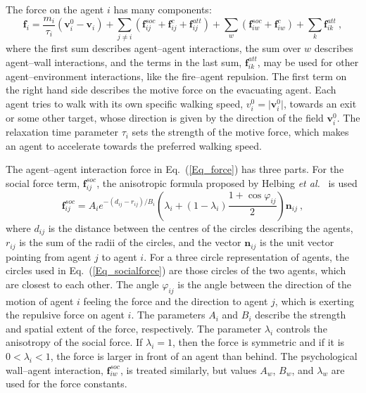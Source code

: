 \documentclass[12pt,a4paper,final,twoside]{stylevk}
\begin{document}
The force on the agent $i$ has many components:
%
\begin{equation}\label{Eq_force}
  \mathbf{f}_i = \frac{m_i}{\tau_i} \left( \mathbf{v}_i^0 -
    \mathbf{v}_i\right) + \sum_{j \ne i} \left( \mathbf{f}_{ij}^{soc}
    + \mathbf{f}_{ij}^{c} + \mathbf{f}_{ij}^{att} \right) + \sum_{w}
  \left( \mathbf{f}^{soc}_{iw} + \mathbf{f}^{c}_{iw} \right) + \sum_{k}
  \mathbf{f}_{ik}^{att} ~,
\end{equation}
%
where the first sum describes agent--agent interactions, the sum over
$w$ describes agent--wall interactions, and the terms in the last sum,
$\mathbf{f}_{ik}^{att}$, may be used for other agent--environment
interactions, like the fire--agent repulsion.  The first term on the
right hand side describes the motive force on the evacuating agent.
Each agent tries to walk with its own specific walking speed, $v^0_i =
\vert \mathbf{v}_i^0 \vert$, towards an exit or some other target,
whose direction is given by the direction of the field $
\mathbf{v}_i^0 $.  The relaxation time parameter $\tau_i$ sets the
strength of the motive force, which makes an agent to accelerate
towards the preferred walking speed.

The agent--agent interaction force in Eq.~(\ref{Eq_force}) has three
parts.  For the social force term, $\mathbf{f}_{ij}^{soc}$, the
anisotropic formula proposed by Helbing {\em et al.}~\cite{Helbing02}
is used
%
\begin{equation}\label{Eq_socialforce}
 \mathbf{f}_{ij}^{soc} = A_i e^{-(d_{ij}-r_{ij})/B_i }
 \left ( \lambda_i + (1-\lambda_i) \frac{1 + \cos \varphi_{ij}}{2}
 \right )  \mathbf{n}_{ij} ~, 
\end{equation}
%
where $d_{ij}$ is the distance between the centres of the circles
describing the agents, $r_{ij}$ is the sum of the radii of the
circles, and the vector $\mathbf{n}_{ij}$ is the unit vector pointing
from agent $j$ to agent $i$.  For a three circle representation of
agents, the circles used in Eq.~(\ref{Eq_socialforce}) are those
circles of the two agents, which are closest to each other.  The angle
$\varphi_{ij}$ is the angle between the direction of the motion of
agent $i$ feeling the force and the direction to agent $j$, which is
exerting the repulsive force on agent $i$.  The parameters $A_i$ and
$B_i$ describe the strength and spatial extent of the force,
respectively.  The parameter $\lambda_i$ controls the anisotropy of
the social force.  If $\lambda_i=1$, then the force is symmetric and
if it is $ 0 < \lambda_i <1$, the force is larger in front of an agent
than behind.  The psychological wall--agent interaction,
$\mathbf{f}_{iw}^{soc}$, is treated similarly, but values $A_w$,
$B_w$, and $\lambda_w$ are used for the force constants.
\end{document}
